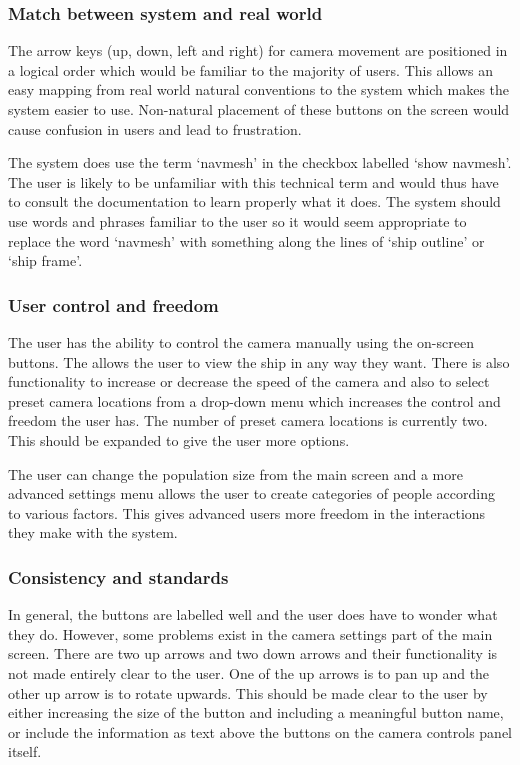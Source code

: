 \documentclass{article}
\begin{document}
\subsubsection{Match between system and real world}
The arrow keys (up, down, left and right) for camera movement are positioned in a logical order which would be familiar to the majority of users. This allows an easy mapping from real world natural conventions to the system which makes the system easier to use. Non-natural placement of these buttons on the screen would cause confusion in users and lead to frustration.

The system does use the term ‘navmesh’ in the checkbox labelled ‘show navmesh’. The user is likely to be unfamiliar with this technical term and would thus have to consult the documentation to learn properly what it does. The system should use words and phrases familiar to the user so it would seem appropriate to replace the word ‘navmesh’ with something along the lines of ‘ship outline’ or ‘ship frame’.

\subsubsection{User control and freedom}
The user has the ability to control the camera manually using the on-screen buttons. The allows the user to view the ship in any way they want. There is also functionality to increase or decrease the speed of the camera and also to select preset camera locations from a drop-down menu which increases the control and freedom the user has. The number of preset camera locations is currently two. This should be expanded to give the user more options.

The user can change the population size from the main screen and a more advanced settings menu allows the user to create categories of people according to various factors. This gives advanced users more freedom in the interactions they make with the system.

\subsubsection{Consistency and standards}
In general, the buttons are labelled well and the user does have to wonder what they do. However, some problems exist in the camera settings part of the main screen. There are two up arrows and two down arrows and their functionality is not made entirely clear to the user. One of the up arrows is to pan up and the other up arrow is to rotate upwards. This should be made clear to the user by either increasing the size of the button and including a meaningful button name, or include the information as text above the buttons on the camera controls panel itself.
\end{document}

